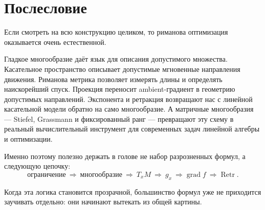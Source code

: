 \documentclass[12pt,a4paper]{article}
\theoremstyle{rudef}
\theoremstyle{ruplain}
\newcommand{\grad}{\operatorname{grad}}
\newcommand{\Retr}{\operatorname{Retr}}
\begin{document}
\section*{Послесловие}

Если смотреть на всю конструкцию целиком, то риманова оптимизация оказывается очень естественной.

Гладкое многообразие даёт язык для описания допустимого множества. Касательное пространство описывает допустимые мгновенные направления движения. Риманова метрика позволяет измерять длины и определять наискорейший спуск. Проекция переносит ambient-градиент в геометрию допустимых направлений. Экспонента и ретракция возвращают нас с линейной касательной модели обратно на само многообразие. А матричные многообразия --- Stiefel, Grassmann и фиксированный ранг --- превращают эту схему в реальный вычислительный инструмент для современных задач линейной алгебры и оптимизации.

Именно поэтому полезно держать в голове не набор разрозненных формул, а следующую цепочку:
\[
\text{ограничение} \ \Longrightarrow \ \text{многообразие} \ \Longrightarrow \ T_xM \ \Longrightarrow \ g_x \ \Longrightarrow \grad f \ \Longrightarrow \Retr.
\]

Когда эта логика становится прозрачной, большинство формул уже не приходится заучивать отдельно: они начинают вытекать из общей картины.
\end{document}
